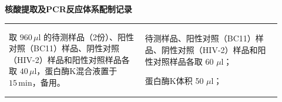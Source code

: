 \documentclass[UTF8,10pt,a4paper,fontset=fandol]{ctexart}
\newcommand{\fieldvalue}[1]{#1}
\newcommand{\handwritten}[1]{#1}
\begin{document}
\begin{center}
\textbf{核酸提取及PCR反应体系配制记录}
\end{center}

\begin{tabular}{|p{0.46\linewidth}|p{0.46\linewidth}|}
\hline
取 $960\,\mu\mathrm{l}$ 的待测样品（2份）、阳性对照（BC11）样品、阴性对照（HIV-2）样品和阳性对照样品各取 $40\,\mu\mathrm{l}$，蛋白酶K混合液置于 $15\,\mathrm{min}$，备用。 &
待测样品、阳性对照（BC11）样品、阴性对照（HIV-2）样品和阳性对照样品各取
\fieldvalue{\handwritten{60}} $\mu\mathrm{l}$；

蛋白酶K体积
\fieldvalue{\handwritten{50}} $\mu\mathrm{l}$；


\end{tabular}
\end{document}
